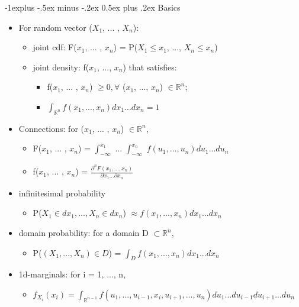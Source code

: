 \documentclass[10pt,landscape]{article}
\makeatletter
\renewcommand{\subsection}{\@startsection{subsection}{2}{0mm}%
                                {-1explus -.5ex minus -.2ex}%
                                {0.5ex plus .2ex}%
                                {\normalfont\normalsize\bfseries}}
\makeatother
\begin{document}
\begin{multicols}{3}
\subsection{Basics}
\begin{itemize}[noitemsep]
  \item For random vector ($X_{1}$, ... , $X_{n}$):
  \begin{itemize}[noitemsep]
    \item joint cdf: F($x_{1}$, ... , $x_{n}$) = P($X_{1} \leq x_{1}$, ..., $X_{n} \leq x_{n}$)
    \item joint density: f($x_{1}$, ..., $x_{n}$) that satisfies:
    \begin{itemize}[noitemsep]
      \item f($x_{1}$, ... , $x_{n}$) $\geq 0, \forall$ ($x_{1}$, ..., $x_{n}$) $\in \mathbb{R}^{n}$;
      \item $\int_{\mathbb{R}^{n}} f(x_{1}, ... , x_{n}) dx_{1} ... dx_{n} = 1$
    \end{itemize}
  \end{itemize}
  \item Connections: for ($x_{1}$, ... , $x_{n}$) $\in \mathbb{R}^{n}$,
  \begin{itemize}[noitemsep]
    \item F($x_{1}$, ... , $x_{n}$) = $\int_{-\infty}^{x_{1}}$ ... $\int_{-\infty}^{x_{n}}$ $f(u_{1}, ... , u_{n}) du_{1} ... du_{n}$
    \item f($x_{1}$, ... , $x_{n}$) = $\frac{\partial^{n}F(x_{1}, ..., x_{n})}{\partial x_{1} ... \partial x_{n}}$
  \end{itemize}
  \item infinitesimal probability
  \begin{itemize}[noitemsep]
    \item P($X_{1} \in dx_{1}, ..., X_{n} \in dx_{n}$) $\approx f(x_{1}, ..., x_{n}) dx_{1} ... dx_{n}$
  \end{itemize}
  \item domain probability: for a domain D $\subset \mathbb{R}^{n}$,
  \begin{itemize}[noitemsep]
    \item P($(X_{1}, ..., X_{n}) \in D$) = $\int_{D} f(x_{1}, ..., x_{n}) dx_{1} ... dx_{n}$
  \end{itemize}
  \item 1d-marginals: for i = 1, ..., n,
  \begin{itemize}[noitemsep]
    \item $f_{X_{i}}(x_{i}) = \int_{\mathbb{R}^{n-1}} f(u_{1}, ..., u_{i-1}, x_{i}, u_{i + 1}, ..., u_{n}) du_{1} ... du_{i-1}du_{i+1}...du_{n}$

\end{itemize}
\end{itemize}
\end{multicols}
\end{document}
